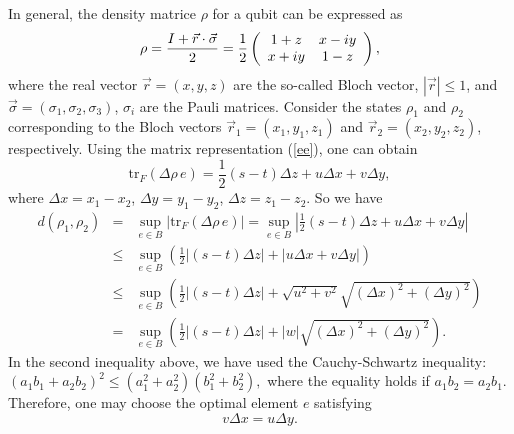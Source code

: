 \documentclass[a4paper,12pt]{article}
\begin{document}
In general, the density matrice $\rho$ for a qubit can be expressed as \cite{Nielsen}
\begin{equation}\label{rr}
	\rho=\frac{I+\vec{r}\cdot \vec{\sigma}}{2}
	=\frac{1}{2}\left(
	\begin{array}{cc}
		1+z & x-{\rm i}y \\
		x+{\rm i}y & 1-z \end{array}
	\right),
\end{equation}
where the real vector $\vec{r}=(x, y, z)$ are the so-called Bloch vector, $|\vec{r}|\leqslant1$, and $\vec{\sigma}=(\sigma_1, \sigma_2, \sigma_3)$, $\sigma_i$ are the Pauli matrices.
Consider the states $\rho_1$ and $\rho_2$ corresponding to the Bloch vectors $\vec{r}_1=(x_1, y_1, z_1)$ and $\vec{r}_2=(x_2, y_2, z_2)$, respectively.
Using the matrix representation (\ref{ee}), one can obtain
\begin{equation}
	\mathrm{tr}_{F}(\Delta\rho\, e)=\frac{1}{2}(s-t)\Delta z+u\Delta x+v\Delta y,
\end{equation}
where
$\Delta x =x_1-x_2$, $\Delta y =y_1-y_2$, $\Delta z =z_1-z_2$.
So we have
\begin{eqnarray}
	d(\rho_1,\rho_2)&=&\sup_{e\in B}|\mathrm{tr}_{F}(\Delta\rho\, e)|
	=\sup_{e\in B}\left|\frac{1}{2}(s-t)\Delta z+u\Delta x+v\Delta y\right|\nonumber\\
	&\leqslant&\sup_{e\in B}\left(\frac{1}{2}|(s-t)\Delta z|+|u\Delta x+v\Delta y|\right)\nonumber\\
	&\leqslant&\sup_{e\in B}\left(\frac{1}{2}|(s-t)\Delta z|
	+\sqrt{u^2+v^2}\sqrt{(\Delta x)^2+(\Delta y)^2}\right)\nonumber\\
	&=&\sup_{e\in B}\left(\frac{1}{2}|(s-t)\Delta z|
	+|w|\sqrt{(\Delta x)^2+(\Delta y)^2}\right).
\end{eqnarray}
In the second inequality above, we have used the Cauchy-Schwartz inequality:
$
(a_1b_1+a_2b_2)^2\leqslant(a_1^2+a_2^2)(b_1^2+b_2^2),
$
where the equality holds if $a_1 b_2=a_2 b_1$.
Therefore, one may choose the optimal element $e$ satisfying
\begin{equation}\label{uv}
	v\Delta x=u\Delta y.
\end{equation}
\end{document}
